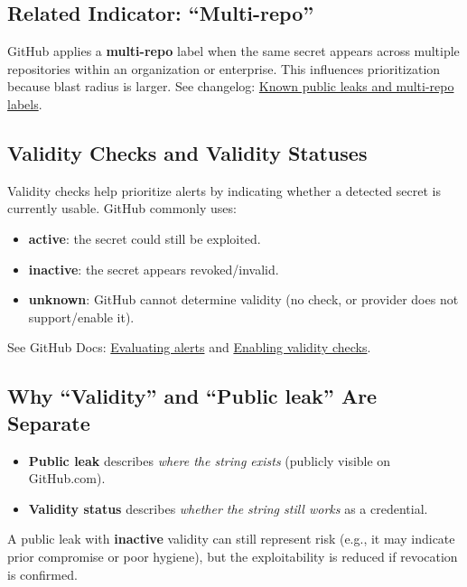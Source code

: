 \documentclass[11pt]{article}
\providecommand{\term}[1]{\textbf{#1}}
\begin{document}
\subsection{Related Indicator: ``Multi-repo''}
GitHub applies a \term{multi-repo} label when the same secret appears across multiple repositories within an organization or enterprise. This influences prioritization because blast radius is larger. See changelog: \href{https://github.blog/changelog/2024-09-19-secret-scanning-indicates-known-public-leaks-and-duplicate-alerts-for-private-exposures-public-beta/}{Known public leaks and multi-repo labels}.

\subsection{Validity Checks and Validity Statuses}
Validity checks help prioritize alerts by indicating whether a detected secret is currently usable. GitHub commonly uses:
\begin{itemize}
  \item \term{active}: the secret could still be exploited.
  \item \term{inactive}: the secret appears revoked/invalid.
  \item \term{unknown}: GitHub cannot determine validity (no check, or provider does not support/enable it).
\end{itemize}
See GitHub Docs: \href{https://docs.github.com/code-security/secret-scanning/managing-alerts-from-secret-scanning/evaluating-alerts}{Evaluating alerts} and \href{https://docs.github.com/en/enterprise-cloud@latest/code-security/how-tos/secure-your-secrets/customize-leak-detection/enabling-validity-checks-for-your-repository}{Enabling validity checks}.

\subsection{Why ``Validity'' and ``Public leak'' Are Separate}
\begin{itemize}
  \item \term{Public leak} describes \emph{where the string exists} (publicly visible on GitHub.com).
  \item \term{Validity status} describes \emph{whether the string still works} as a credential.
\end{itemize}
A public leak with \term{inactive} validity can still represent risk (e.g., it may indicate prior compromise or poor hygiene), but the exploitability is reduced if revocation is confirmed.
\end{document}
